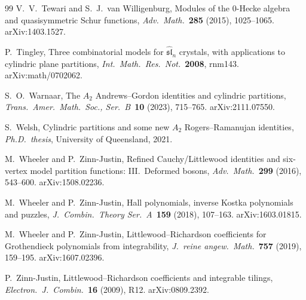 \documentclass[11pt]{article}
\theoremstyle{plain}
\theoremstyle{definition}
\theoremstyle{remark}
\begin{document}
\begin{thebibliography}{99}
V.~V.~Tewari and S.~J.~van Willigenburg,
Modules of the $0$-Hecke algebra and quasisymmetric Schur
functions,
\emph{Adv.\ Math.}\ \textbf{285} (2015), 1025--1065.
arXiv:1403.1527.

P.~Tingley,
Three combinatorial models for
$\widehat{\mathfrak{sl}}_n$ crystals, with applications to
cylindric plane partitions,
\emph{Int.\ Math.\ Res.\ Not.}\ \textbf{2008},
rnm143.
arXiv:math/0702062.

S.~O.~Warnaar,
The $A_2$ Andrews--Gordon identities and cylindric partitions,
\emph{Trans.\ Amer.\ Math.\ Soc., Ser.\ B}\ \textbf{10}
(2023), 715--765.
arXiv:2111.07550.

S.~Welsh,
Cylindric partitions and some new $A_2$ Rogers--Ramanujan
identities,
\emph{Ph.D.\ thesis}, University of Queensland, 2021.

M.~Wheeler and P.~Zinn-Justin,
Refined Cauchy/Littlewood identities and six-vertex model
partition functions: III.\ Deformed bosons,
\emph{Adv.\ Math.}\ \textbf{299} (2016), 543--600.
arXiv:1508.02236.

M.~Wheeler and P.~Zinn-Justin,
Hall polynomials, inverse Kostka polynomials and puzzles,
\emph{J.~Combin.\ Theory Ser.~A}\ \textbf{159} (2018), 107--163.
arXiv:1603.01815.

M.~Wheeler and P.~Zinn-Justin,
Littlewood--Richardson coefficients for Grothendieck
polynomials from integrability,
\emph{J.~reine angew.\ Math.}\ \textbf{757} (2019), 159--195.
arXiv:1607.02396.

P.~Zinn-Justin,
Littlewood--Richardson coefficients and integrable tilings,
\emph{Electron.\ J.\ Combin.}\ \textbf{16} (2009), R12.
arXiv:0809.2392.

\end{thebibliography}
\end{document}
